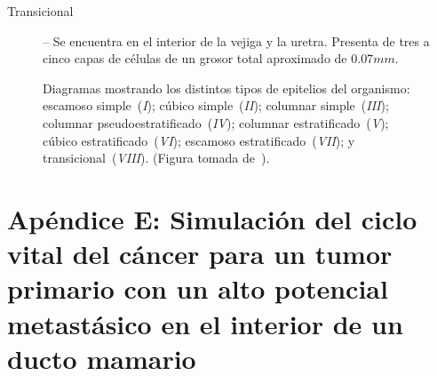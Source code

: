 \begin{appendixes}
\begin{description}
    \item [Transicional] -- Se encuentra en el interior de la vejiga y la uretra. Presenta de tres a cinco capas de c\'elulas de un grosor total aproximado de $0$.$07mm$.
    \end{description}
    
    \begin{figure}[!ht]
    \begin{center}
    \end{center}
    \caption[Diagramas mostrando los distintos tipos de epitelios del organismo]{Diagramas mostrando los distintos tipos de epitelios del organismo: escamoso simple~(\emph{I});  c\'ubico simple~(\emph{II}); columnar simple~(\emph{III}); columnar pseudoestratificado~(\emph{IV}); columnar estratificado~(\emph{V}); c\'ubico estratificado~(\emph{VI}); escamoso estratificado~(\emph{VII}); y transicional~(\emph{VIII}). (Figura tomada de~\cite{robins}).}
    \label{fig-epitheliums}
    \end{figure}
    
    \section{Ap\'endice E: Simulaci\'on del ciclo vital del c\'ancer para un tumor primario con un alto potencial metast\'asico en el interior de un ducto mamario}
    \label{app-e}
    
    \begin{table}[!ht]
    \begin{center}
\end{center}
\end{table}
\end{appendixes}
